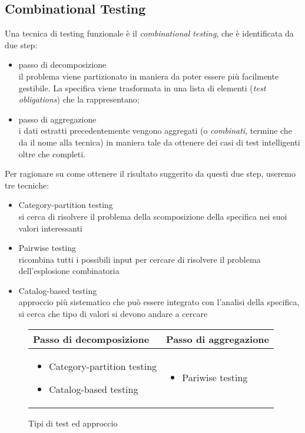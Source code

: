 \subsection{Combinational Testing}

Una tecnica di testing funzionale è il \textit{combinational testing}, che è identificata da due step: \begin{itemize}
    \item passo di decomposizione \\ il problema viene partizionato in maniera da poter essere più facilmente gestibile. La specifica viene trasformata in una lista di elementi (\textit{test obligations}) che la rappresentano;
    \item passo di aggregazione \\ i dati estratti precedentemente vengono aggregati (o \textit{combinati}, termine che da il nome alla tecnica) in maniera tale da ottenere dei casi di test intelligenti oltre che completi.
\end{itemize}

Per ragionare su come ottenere il risultato suggerito da questi due step, useremo tre tecniche: \begin{itemize}
    \item Category-partition testing \\ si cerca di risolvere il problema della scomposizione della specifica nei suoi valori interessanti
    \item Pairwise testing \\ ricombina tutti i possibili input per cercare di risolvere il problema dell'esplosione combinatoria
    \item Catalog-based testing \\ approccio più sistematico che può essere integrato con l'analisi della specifica, si cerca che tipo di valori si devono andare a cercare
\end{itemize}

\begin{figure}[H]
\caption{Tipi di test ed approccio}
\begin{center}
\begin{tabular}{p{5cm} | p{5cm}}
    Passo di decomposizione & Passo di aggregazione \\ \hline
    \begin{itemize}
        \item Category-partition testing
        \item Catalog-based testing
    \end{itemize}
    & \begin{itemize}
        \item Pariwise testing
    \end{itemize}
\end{tabular}
\end{center}
\end{figure}

